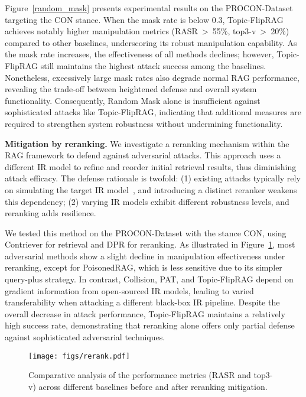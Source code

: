 Figure~\ref{random_mask} presents experimental results on the PROCON-Dataset targeting the CON stance. When the mask rate is below 0.3, Topic-FlipRAG achieves notably higher manipulation metrics (RASR~>~55\%, top3-v~>~20\%) compared to other baselines, underscoring its robust manipulation capability. As the mask rate increases, the effectiveness of all methods declines; however, Topic-FlipRAG still maintains the highest attack success among the baselines. Nonetheless, excessively large mask rates also degrade normal RAG performance, revealing the trade-off between heightened defense and overall system functionality. Consequently, Random Mask alone is insufficient against sophisticated attacks like Topic-FlipRAG, indicating that additional measures are required to strengthen system robustness without undermining functionality.

\textbf{Mitigation by reranking.} We investigate a reranking mechanism within the RAG framework to defend against adversarial attacks. This approach uses a different IR model to refine and reorder initial retrieval results, thus diminishing attack efficacy. The defense rationale is twofold: (1) existing attacks typically rely on simulating the target IR model~\cite{cho2024typos,liu2022order,liu2024multi}, and introducing a distinct reranker weakens this dependency; (2) varying IR models exhibit different robustness levels, and reranking adds resilience. 

We tested this method on the PROCON-Dataset with the stance CON, using Contriever for retrieval and DPR for reranking. As illustrated in Figure~\ref{rerank}, most adversarial methods show a slight decline in manipulation effectiveness under reranking, except for PoisonedRAG, which is less sensitive due to its simpler query-plus strategy. In contrast, Collision, PAT, and Topic-FlipRAG depend on gradient information from open-sourced IR models, leading to varied transferability when attacking a different black-box IR pipeline. Despite the overall decrease in attack performance, Topic-FlipRAG maintains a relatively high success rate, demonstrating that reranking alone offers only partial defense against sophisticated adversarial techniques.

\begin{figure}[!t]
  \centering
  \texttt{[image: figs/rerank.pdf]}
  \caption{Comparative analysis of the performance metrics (RASR and top3-v) across different baselines before and after reranking mitigation.}
  \label{rerank}
\end{figure}

